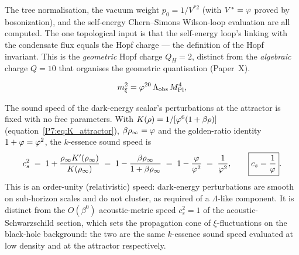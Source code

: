 \begin{remark}
\label{P7:rem:cc_norm_status}
The tree normalisation, the vacuum weight $p_0=1/V^{*2}$ (with
$V^*=\varphi$ proved by bosonization), and the self-energy Chern--Simons
Wilson-loop evaluation are all computed. The one topological input is
that the self-energy loop's linking with the condensate flux equals
the Hopf charge --- the definition of the Hopf invariant. This is the
\emph{geometric} Hopf charge $Q_H=2$, distinct from the
\emph{algebraic} charge $Q=10$ that organises the geometric
quantisation (Paper~X).
\end{remark}

\begin{equation}
  m_\xi^2 = \varphi^{20}\,\Lambda_{\mathrm{obs}}\,M_{\mathrm{Pl}}^4,
  \label{P7:eq:mxi}
\end{equation}

\begin{remark}
\label{P7:rem:cs_de}
The sound speed of the dark-energy scalar's perturbations at the
attractor is fixed with no free parameters. With
$K(\rho)=1/[\varphi^6(1+\beta\rho)]$ (equation~\eqref{P7:eq:K_attractor}),
$\beta\rho_{\infty}=\varphi$ and the golden-ratio identity $1+\varphi=\varphi^2$, the
$k$-essence sound speed is
\begin{equation}
  c_s^2 \;=\; 1 + \frac{\rho_{\infty} K'(\rho_{\infty})}{K(\rho_{\infty})}
        \;=\; 1 - \frac{\beta\rho_{\infty}}{1+\beta\rho_{\infty}}
        \;=\; 1 - \frac{\varphi}{\varphi^2}
        \;=\; \frac{1}{\varphi^2},
        \qquad \boxed{c_s=\frac{1}{\varphi}}.
  \label{P7:eq:cs_de}
\end{equation}
This is an order-unity (relativistic) speed: dark-energy perturbations
are smooth on sub-horizon scales and do not cluster, as required of a
$\Lambda$-like component. It is distinct from the $O(\beta^0)$
acoustic-metric speed $c_s^2=1$ of the acoustic-Schwarzschild section,
which sets the propagation cone of $\xi$-fluctuations on the
black-hole background: the two are the same $k$-essence sound speed
evaluated at low density and at the attractor respectively.
\end{remark}

